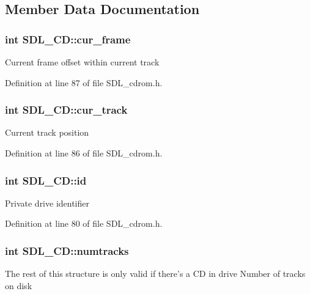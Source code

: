 \subsection{Member Data Documentation}
\hypertarget{structSDL__CD_a42123aeca413aa581c1403843d1a5809}{
\subsubsection[{cur\+\_\+frame}]{\setlength{\rightskip}{0pt plus 5cm}int S\+D\+L\+\_\+\+C\+D\+::cur\+\_\+frame}}\label{structSDL__CD_a42123aeca413aa581c1403843d1a5809}
Current frame offset within current track 

Definition at line 87 of file S\+D\+L\+\_\+cdrom.\+h.

\hypertarget{structSDL__CD_afe5a3ca65be47b34c72ac21ce28de31e}{
\subsubsection[{cur\+\_\+track}]{\setlength{\rightskip}{0pt plus 5cm}int S\+D\+L\+\_\+\+C\+D\+::cur\+\_\+track}}\label{structSDL__CD_afe5a3ca65be47b34c72ac21ce28de31e}
Current track position 

Definition at line 86 of file S\+D\+L\+\_\+cdrom.\+h.

\hypertarget{structSDL__CD_ab48f9cbecf78bc689649d877eceba103}{
\subsubsection[{id}]{\setlength{\rightskip}{0pt plus 5cm}int S\+D\+L\+\_\+\+C\+D\+::id}}\label{structSDL__CD_ab48f9cbecf78bc689649d877eceba103}
Private drive identifier 

Definition at line 80 of file S\+D\+L\+\_\+cdrom.\+h.

\hypertarget{structSDL__CD_ade87d0c7e217291fb1f1a53d03e1bfdf}{
\subsubsection[{numtracks}]{\setlength{\rightskip}{0pt plus 5cm}int S\+D\+L\+\_\+\+C\+D\+::numtracks}}\label{structSDL__CD_ade87d0c7e217291fb1f1a53d03e1bfdf}
The rest of this structure is only valid if there's a C\+D in drive Number of tracks on disk 

